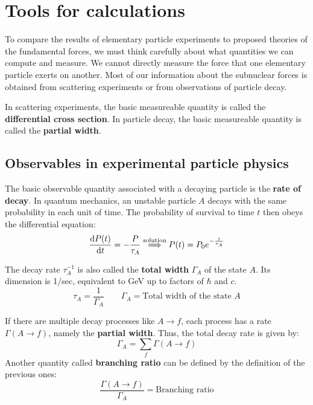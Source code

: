 \documentclass[../../main/main.tex]{subfiles}
\begin{document}
\chapter{Tools for calculations}
To compare the results of elementary particle experiments to proposed theories of the fundamental forces, we must think carefully about what quantities we can compute and measure. We cannot directly measure the force that one elementary particle exerts on another. Most of our information about the subnuclear forces is obtained from scattering experiments or from observations of particle decay.

In scattering experiments, the basic measureable quantity is called the \textbf{differential cross section}. In particle decay, the basic measureable quantity is called the \textbf{partial width}.





\section{Observables in experimental particle physics}
The basic observable quantity associated with a decaying particle is the \textbf{rate of decay}. In quantum mechanics, an unstable particle \( A \) decays with the same probability in each unit of time. The probability of survival to time \( t \) then obeys the differential equation:
\begin{equation}
    \dv{P(t)}{t} = - \frac{P}{\tau_A}
    \overset{\small \text{solution}}{\Longrightarrow}
    P(t) = P_0 e^{-\frac{t}{\tau_A}}
    \label{eq:L03_PST}
\end{equation}

The decay rate \( \tau_{A}^{-1} \) is also called the \textbf{total width} \( \Gamma_{A} \) of the state \( A \). Its dimension is 1/sec, equivalent to GeV up to factors of \( \hbar \) and \( c \).
\begin{equation}
    \tau_A = \frac{1}{\Gamma_A}
    \qquad
    \Gamma_A = \text{Total width of the state } A
    \label{eq:L03_TW}
\end{equation}

If there are multiple decay processes like \( A \longrightarrow f \), each process has a rate \( \Gamma(A\longrightarrow f) \), namely the \textbf{partial width}. Thus, the total decay rate is given by:
\begin{equation}
    \Gamma_A = \sum_{f} \Gamma(A \longrightarrow f)
    \label{eq:L03_TDR}
\end{equation}
Another quantity called \textbf{branching ratio} can be defined by the definition of the previous ones:
\begin{equation}
    \frac{\Gamma(A \longrightarrow f)}{\Gamma_A}
    =
    \text{Branching ratio}
    \label{eq:L03_BR}
\end{equation}
\end{document}
